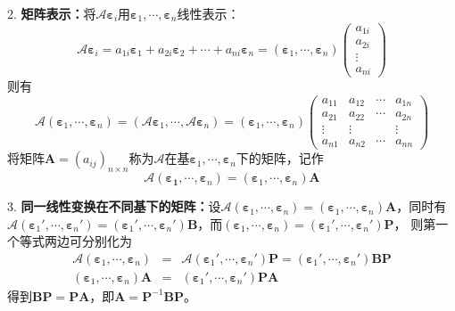 2. \textbf{矩阵表示：}将$\mathscr{A}\boldsymbol{\varepsilon}_i$用$\boldsymbol{\varepsilon}_1,\cdots,\boldsymbol{\varepsilon}_n$线性表示：
\begin{equation*}
    \mathscr{A}\boldsymbol{\varepsilon}_i=a_{1i}\boldsymbol{\varepsilon}_1+a_{2i}\boldsymbol{\varepsilon}_2+\cdots+a_{ni}\boldsymbol{\varepsilon}_n=(\boldsymbol{\varepsilon}_1,\cdots,\boldsymbol{\varepsilon}_n)\begin{pmatrix}
        a_{1i}\\
        a_{2i}\\
        \vdots\\
        a_{ni}
    \end{pmatrix}
\end{equation*}
则有\begin{equation*}
    \mathscr{A}(\boldsymbol{\varepsilon}_1,\cdots,\boldsymbol{\varepsilon}_n)=(\mathscr{A}\boldsymbol{\varepsilon}_1,\cdots,\mathscr{A}\boldsymbol{\varepsilon}_n)
    =(\boldsymbol{\varepsilon}_1,\cdots,\boldsymbol{\varepsilon}_n)\begin{pmatrix}
        a_{11}&a_{12}&\cdots&a_{1n}\\
        a_{21}&a_{22}&\cdots&a_{2n}\\
        \vdots&\vdots&&\vdots\\
        a_{n1}&a_{n2}&\cdots&a_{nn}
    \end{pmatrix}
\end{equation*}
将矩阵$\boldsymbol{A}=(a_{ij})_{n\times n}$称为$\mathscr{A}$在基$\boldsymbol{\varepsilon}_1,\cdots,\boldsymbol{\varepsilon}_n$下的矩阵，记作
\begin{equation*}
    \mathscr{A}(\boldsymbol{\varepsilon_1},\cdots,\boldsymbol{\varepsilon}_n)=(\boldsymbol{\varepsilon}_1,\cdots,\boldsymbol{\varepsilon}_n)\boldsymbol{A}
\end{equation*}

3. \textbf{同一线性变换在不同基下的矩阵：}设$\mathscr{A}(\boldsymbol{\varepsilon}_1,\cdots,\boldsymbol{\varepsilon}_n)=(\boldsymbol{\varepsilon}_1,\cdots,\boldsymbol{\varepsilon}_n)\boldsymbol{A}$，同时有
$\mathscr{A}(\boldsymbol{\varepsilon}_1',\cdots,\boldsymbol{\varepsilon}_n')=(\boldsymbol{\varepsilon}_1',\cdots,\boldsymbol{\varepsilon}_n')\boldsymbol{B}$，而$(\boldsymbol{\varepsilon}_1,\cdots,\boldsymbol{\varepsilon}_n)=(\boldsymbol{\varepsilon}_1',\cdots,\boldsymbol{\varepsilon}_n')\boldsymbol{P}$，
则第一个等式两边可分别化为
\begin{eqnarray*}
    \mathscr{A}(\boldsymbol{\varepsilon}_1,\cdots,\boldsymbol{\varepsilon}_n)&=&\mathscr{A}(\boldsymbol{\varepsilon}_1',\cdots,\boldsymbol{\varepsilon}_n')\boldsymbol{P}=(\boldsymbol{\varepsilon}_1',\cdots,\boldsymbol{\varepsilon}_n')\boldsymbol{BP}\\
    (\boldsymbol{\varepsilon}_1,\cdots,\boldsymbol{\varepsilon}_n)\boldsymbol{A}&=&(\boldsymbol{\varepsilon}_1',\cdots,\boldsymbol{\varepsilon}_n')\boldsymbol{PA}
\end{eqnarray*}
得到$\boldsymbol{BP}=\boldsymbol{PA}$，即$\boldsymbol{A}=\boldsymbol{P}^{-1}\boldsymbol{BP}$。

